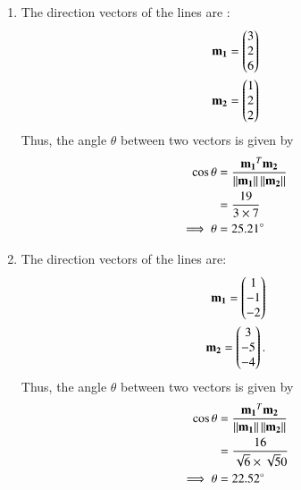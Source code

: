 \begin{enumerate}
    \item The direction vectors of the lines are :
\begin{align}
    \mathbf{m_1}=\begin{pmatrix}3 \\ 2 \\6\end{pmatrix} \\    
    \mathbf{m_2}=\begin{pmatrix}1 \\ 2 \\2\end{pmatrix}
\end{align}
Thus, the angle $\theta$ between two vectors is given by 
\begin{align}
\cos \theta &= \frac{\mathbf{m_1}^T\mathbf{m_2}}{\left\lVert\mathbf{m_1}\right\rVert\left\lVert\mathbf{m_2}\right\rVert}\\
&=\frac{19}{3\times7}\\
\implies \theta &= 25.21\degree
\end{align}
\item The direction vectors of the lines are:
\begin{align}
    \mathbf{m_1}=\begin{pmatrix}1 \\ -1 \\-2\end{pmatrix}\\
    \mathbf{m_2}=\begin{pmatrix}3 \\ -5 \\-4\end{pmatrix}.
\end{align}
Thus, the angle $\theta$ between two vectors is given by 
\begin{align}
\cos \theta &= \frac{\mathbf{m_1}^T\mathbf{m_2}}{\left\lVert\mathbf{m_1}\right\rVert\left\lVert\mathbf{m_2}\right\rVert}\\
&=\frac{16}{\sqrt6\times\sqrt50}\\
\implies \theta &= 22.52\degree
\end{align}
\end{enumerate} 
